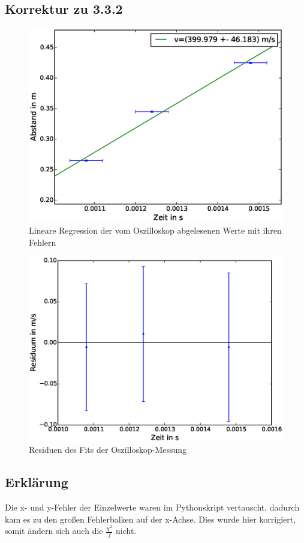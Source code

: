 \documentclass[12pt,a4paper]{article}
\begin{document}
\subsection{Korrektur zu 3.3.2}
\begin{figure}[H]
\centering
\includegraphics[scale=0.7]{Bilder/linreg-oszi-laufzeit.eps}
\caption{Lineare Regression der vom Oszilloskop abgelesenen Werte mit ihren Fehlern}
\end{figure}
\begin{figure}[H]
\centering
\includegraphics[scale=0.7]{Bilder/residuum-oszi-laufzeit.eps}
\caption{Residuen des Fits der Oszilloskop-Messung}
\end{figure}
\subsection{Erklärung}
Die x- und y-Fehler der Einzelwerte waren im Pythonskript vertauscht, dadurch kam es zu den großen Fehlerbalken auf der x-Achse. Dies wurde hier korrigiert, somit ändern sich auch die $\frac{\chi^2}{f}$ nicht.
\end{document}
